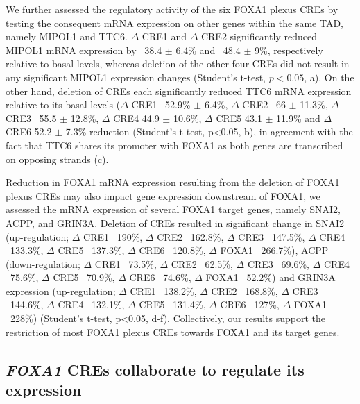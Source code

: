 We further assessed the regulatory activity of the six FOXA1 plexus CREs by testing the consequent mRNA expression on other genes within the same TAD, namely MIPOL1 and TTC6.
$\Delta$ CRE1 and $\Delta$ CRE2 significantly reduced MIPOL1 mRNA expression by ~38.4 $\pm$ 6.4\% and ~48.4 $\pm$ 9\%, respectively relative to basal levels, whereas deletion of the other four CREs did not result in any significant MIPOL1 expression changes (Student’s t-test, $p<0.05$, a).
On the other hand, deletion of CREs each significantly reduced TTC6 mRNA expression relative to its basal levels ($\Delta$ CRE1 ~52.9\% $\pm$ 6.4\%, $\Delta$ CRE2 ~66 $\pm$ 11.3\%, $\Delta$ CRE3 ~55.5 $\pm$ 12.8\%, $\Delta$ CRE4 44.9 $\pm$ 10.6\%, $\Delta$ CRE5 43.1 $\pm$ 11.9\% and $\Delta$ CRE6 52.2 $\pm$ 7.3\% reduction (Student’s t-test, p<0.05, b), in agreement with the fact that TTC6 shares its promoter with FOXA1 as both genes are transcribed on opposing strands (c).

Reduction in FOXA1 mRNA expression resulting from the deletion of FOXA1 plexus CREs may also impact gene expression downstream of FOXA1, we assessed the mRNA expression of several FOXA1 target genes, namely SNAI2, ACPP, and GRIN3A.
Deletion of CREs resulted in significant change in SNAI2 (up-regulation; $\Delta$ CRE1 ~190\%, $\Delta$ CRE2 ~162.8\%, $\Delta$ CRE3 ~147.5\%, $\Delta$ CRE4 ~133.3\%, $\Delta$ CRE5 ~137.3\%, $\Delta$ CRE6 ~120.8\%, $\Delta$ FOXA1 ~266.7\%), ACPP (down-regulation; $\Delta$ CRE1 ~73.5\%, $\Delta$ CRE2 ~62.5\%, $\Delta$ CRE3 ~69.6\%, $\Delta$ CRE4 ~75.6\%, $\Delta$ CRE5 ~70.9\%, $\Delta$ CRE6 ~74.6\%, $\Delta$ FOXA1 ~52.2\%) and GRIN3A expression (up-regulation; $\Delta$ CRE1 ~138.2\%, $\Delta$ CRE2 ~168.8\%, $\Delta$ CRE3 ~144.6\%, $\Delta$ CRE4 ~132.1\%, $\Delta$ CRE5 ~131.4\%, $\Delta$ CRE6 ~127\%, $\Delta$ FOXA1 ~228\%) (Student’s t-test, p<0.05, d-f).
Collectively, our results support the restriction of most FOXA1 plexus CREs towards FOXA1 and its target genes.

\subsection{\emph{FOXA1} CREs collaborate to regulate its expression}

